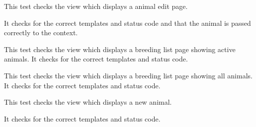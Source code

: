 \documentclass[letterpaper,10pt,english]{sphinxmanual}
\begin{document}
\begin{fulllineitems}

\begin{fulllineitems}
\label{animals:mousedb.animal.tests.AnimalViewTests.test_animal_edit}
This test checks the view which displays a animal edit page.

It checks for the correct templates and status code and that the animal is passed correctly to the context.

\end{fulllineitems}


\begin{fulllineitems}
\label{animals:mousedb.animal.tests.AnimalViewTests.test_animal_list}
This test checks the view which displays a breeding list page showing active animals.  It checks for the correct templates and status code.

\end{fulllineitems}


\begin{fulllineitems}
\label{animals:mousedb.animal.tests.AnimalViewTests.test_animal_list_all}
This test checks the view which displays a breeding list page showing all animals.  It checks for the correct templates and status code.

\end{fulllineitems}


\begin{fulllineitems}
\label{animals:mousedb.animal.tests.AnimalViewTests.test_animal_new}
This test checks the view which displays a new animal.

It checks for the correct templates and status code.

\end{fulllineitems}


\end{fulllineitems}

\end{document}
